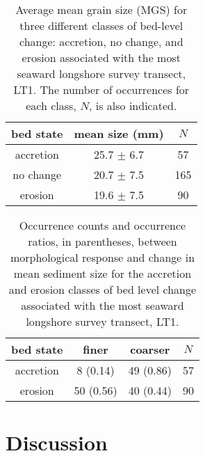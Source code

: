 \documentclass[jmse,article,submit,pdftex,moreauthors]{Definitions/mdpi}
\begin{document}
\begin{table}[tbp!]
	\caption[Mean grain size correspoonding to bed accretion, no change, and erosion]{Average mean grain size (MGS) for three different classes of bed-level change: accretion, no change, and erosion associated with the most seaward longshore survey transect, LT1. The number of occurrences for each class, $N$, is also indicated.} 
	\label{table:dz_mgs}
	\centering
	\begin{tabular}{ccc}
		\hline
		bed state & mean size (mm) & $N$\\
		\hline
		accretion & 25.7 $\pm$ 6.7 & 57\\
		no change & 20.7 $\pm$ 7.5 & 165\\
		erosion   & 19.6 $\pm$ 7.5 & 90\\
		\hline
	\end{tabular}
\end{table}

\begin{table}[tbp!]
	\caption[Occurrence counts of bed fining and coarsening during bed accretion and erosion]{Occurrence counts and occurrence ratios, in parentheses, between morphological response and change in mean sediment size for the accretion and erosion classes of bed level change associated with the most seaward longshore survey transect, LT1.} 
	\label{table:dz_dmgs}
	\centering
	\begin{tabular}{cccc}
		\hline
		bed state & finer & coarser & $N$\\
		\hline
		accretion & 8 (0.14) & 49 (0.86) & 57\\
		erosion & 50 (0.56) & 40 (0.44) & 90\\
		\hline
	\end{tabular}
\end{table}

\section{Discussion}\label{Discussion}

\end{document}
